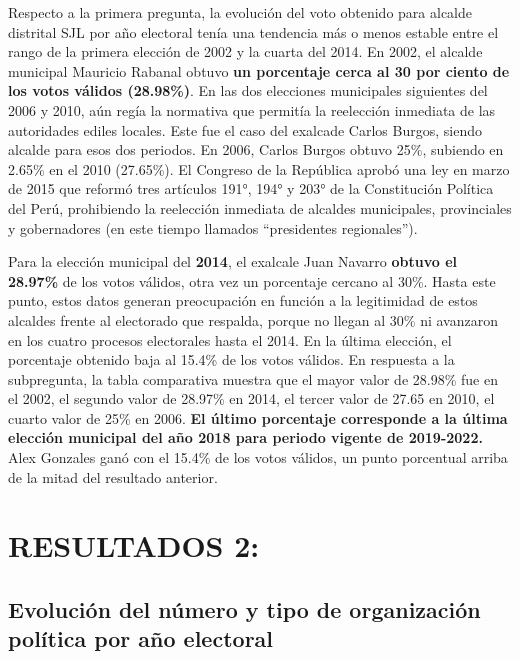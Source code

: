 \documentclass[
]{book}
\begin{document}
Respecto a la primera pregunta, la evolución del voto obtenido para alcalde distrital SJL por año electoral tenía una tendencia más o menos estable entre el rango de la primera elección de 2002 y la cuarta del 2014. En 2002, el alcalde municipal Mauricio Rabanal obtuvo \textbf{un porcentaje cerca al 30 por ciento de los votos válidos (28.98\%)}. En las dos elecciones municipales siguientes del 2006 y 2010, aún regía la normativa que permitía la reelección inmediata de las autoridades ediles locales. Este fue el caso del exalcade Carlos Burgos, siendo alcalde para esos dos periodos. En 2006, Carlos Burgos obtuvo 25\%, subiendo en 2.65\% en el 2010 (27.65\%). El Congreso de la República aprobó una ley en marzo de 2015 que reformó tres artículos 191°, 194° y 203° de la Constitución Política del Perú, prohibiendo la reelección inmediata de alcaldes municipales, provinciales y gobernadores (en este tiempo llamados ``presidentes regionales'').

Para la elección municipal del \textbf{2014}, el exalcale Juan Navarro \textbf{obtuvo el 28.97\%} de los votos válidos, otra vez un porcentaje cercano al 30\%. Hasta este punto, estos datos generan preocupación en función a la legitimidad de estos alcaldes frente al electorado que respalda, porque no llegan al 30\% ni avanzaron en los cuatro procesos electorales hasta el 2014. En la última elección, el porcentaje obtenido baja al 15.4\% de los votos válidos. En respuesta a la subpregunta, la tabla comparativa muestra que el mayor valor de 28.98\% fue en el 2002, el segundo valor de 28.97\% en 2014, el tercer valor de 27.65 en 2010, el cuarto valor de 25\% en 2006. \textbf{El último porcentaje corresponde a la última elección municipal del año 2018 para periodo vigente de 2019-2022.} Alex Gonzales ganó con el 15.4\% de los votos válidos, un punto porcentual arriba de la mitad del resultado anterior.

\hypertarget{resultados-2}{%
\section{RESULTADOS 2:}\label{resultados-2}}

\hypertarget{evoluciuxf3n-del-nuxfamero-y-tipo-de-organizaciuxf3n-poluxedtica-por-auxf1o-electoral}{%
\subsection{Evolución del número y tipo de organización política por año electoral}\label{evoluciuxf3n-del-nuxfamero-y-tipo-de-organizaciuxf3n-poluxedtica-por-auxf1o-electoral}}
\end{document}
